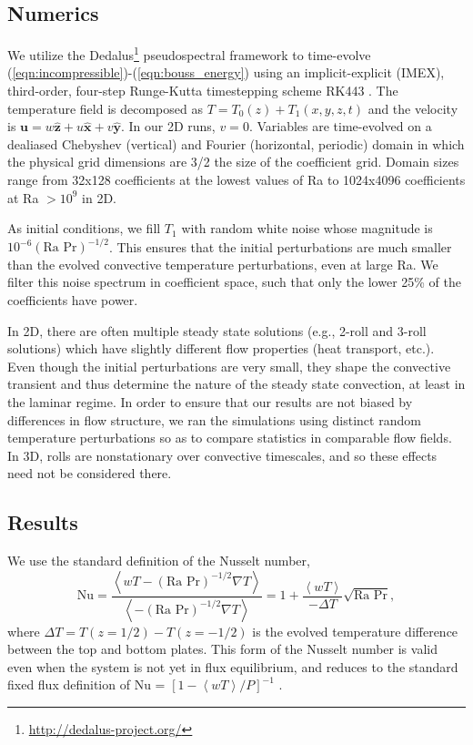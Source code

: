 \documentclass[aps, pre, onecolumn, nofootinbib, notitlepage, groupedaddress, amsfonts, amssymb, amsmath, longbibliography]{revtex4-1}
\newcommand{\angles}[1]{\ensuremath{\left\langle #1 \right\rangle}}
\newcommand{\grad}{\ensuremath{\nabla}}
\begin{document}
\subsection{Numerics}
We utilize the 
Dedalus\footnote{\url{http://dedalus-project.org/}} 
pseudospectral framework \cite{burns&all2016} to time-evolve  
(\ref{eqn:incompressible})-(\ref{eqn:bouss_energy}) 
using an implicit-explicit (IMEX), third-order, four-step 
Runge-Kutta timestepping scheme RK443 \cite{ascher&all1997}.  
The temperature field is decomposed as $T = T_0(z) + T_1(x, y, z, t)$
and the velocity is $\bm{u} = w\bm{\hat{z}} + u\bm{\hat{x}} + v\bm{\hat{y}}$.
In our 2D runs, $v = 0$.
Variables are time-evolved on a dealiased Chebyshev (vertical)
and Fourier (horizontal, periodic) domain in which the
physical grid dimensions are 3/2 the size of the coefficient grid.  
Domain sizes range from
32x128 coefficients at the lowest values of 
Ra to 1024x4096 coefficients at Ra $> 10^{9}$ in 2D.

As initial conditions, we fill $T_1$ with
random white noise whose magnitude is $10^{-6}(\text{Ra Pr})^{-1/2}$.
This ensures that the initial perturbations are much smaller than the
evolved convective temperature perturbations, even at large Ra.
We filter this noise spectrum in coefficient space, 
such that only the lower 25\% of the coefficients
have power.

In 2D, there are often multiple steady state solutions (e.g., 2-roll and 3-roll
solutions) which have slightly different flow properties (heat transport, etc.).
Even though the initial perturbations are very small, they shape the convective
transient and thus determine the nature of the steady state convection, at least in
the laminar regime.  In order to ensure that our results are not biased by differences
in flow structure, we ran the simulations using distinct random temperature perturbations
so as to compare statistics in comparable flow fields.  In 3D, rolls are nonstationary over
convective timescales, and so these effects need not be considered there.

\subsection{Results}
We use the standard definition of the Nusselt number,
\begin{equation}
\text{Nu} = \frac{\angles{wT - (\text{Ra Pr})^{-1/2}\grad T}}{\angles{- (\text{Ra Pr})^{-1/2} \grad T}} =
1 + \frac{\angles{wT}}{-\Delta T}\sqrt{\text{Ra Pr}},
\end{equation}
where $\Delta T = T(z = 1/2) - T(z = -1/2)$ is the evolved temperature difference
between the top and bottom plates.  This form of the Nusselt number is valid even when
the system is not yet in flux equilibrium, and reduces to the standard fixed flux definition
of Nu  = $[1 - \angles{wT} / P]^{-1}$ \cite{johnston&doering2009}.
\end{document}

